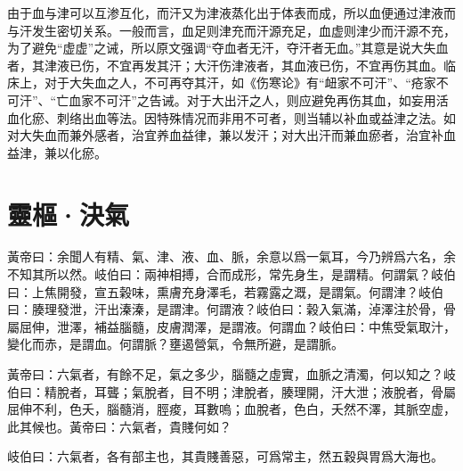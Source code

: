 \documentclass[12pt]{ctexbook}
\begin{document}
由于血与津可以互渗互化，而汗又为津液蒸化出于体表而成，所以血便通过津液而与汗发生密切关系。一般而言，血足则津充而汗源充足，血虚则津少而汗源不充，为了避免“虚虚”之诫，所以原文强调“夺血者无汗，夺汗者无血。”其意是说大失血者，其津液已伤，不宜再发其汗；大汗伤津液者，其血液已伤，不宜再伤其血。临床上，对于大失血之人，不可再夺其汗，如《伤寒论》有“衄家不可汗”、“疮家不可汗”、“亡血家不可汗”之告诫。对于大出汗之人，则应避免再伤其血，如妄用活血化瘀、刺络出血等法。因特殊情况而非用不可者，则当辅以补血或益津之法。如对大失血而兼外感者，治宜养血益律，兼以发汗；对大出汗而兼血瘀者，治宜补血益津，兼以化瘀。

\section{靈樞·決氣}%


\begin{yuanwen}
黃帝曰：余聞人有精、氣、津、液、血、脈，余意以爲一氣耳，今乃辨爲六名，余不知其所以然。岐伯曰：兩神相搏，合而成形，常先身生，是謂精。何謂氣？岐伯曰：上焦開發，宣五榖味，熏膚充身澤毛，若霧露之溉，是謂氣。何謂津？岐伯曰：腠理發泄，汗出溱溱，是謂津。何謂液？岐伯曰：榖入氣滿，淖澤注於骨，骨屬屈伸，泄澤，補益腦髓，皮膚潤澤，是謂液。何謂血？岐伯曰：中焦受氣取汁，變化而赤，是謂血。何謂脈？壅遏營氣，令無所避，是謂脈。

黃帝曰：六氣者，有餘不足，氣之多少，腦髓之虛實，血脈之清濁，何以知之？岐伯曰：精脫者，耳聾；氣脫者，目不明；津脫者，腠理開，汗大泄；液脫者，骨屬屈伸不利，色夭，腦髓消，脛痠，耳數嗚；血脫者，色白，夭然不澤，其脈空虚，此其候也。黃帝曰：六氣者，貴賤何如？

岐伯曰：六氣者，各有部主也，其貴賤善惡，可爲常主，然五穀與胃爲大海也。
\end{yuanwen}

\end{document}
